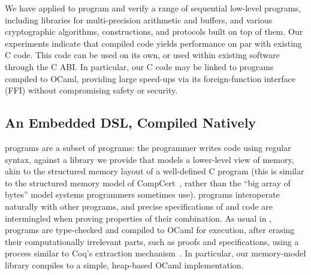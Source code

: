 We have applied \lowstar to program and verify a range of sequential low-level
programs, including libraries for multi-precision arithmetic and
buffers, and various cryptographic algorithms, constructions, and
protocols built on top of them.
%
Our experiments indicate that compiled \lowstar code yields performance
on par with existing C code. This code can be used on its own,
or used within existing software through the C ABI. In particular, our C code may
be linked to \fstar programs compiled to
OCaml, providing large speed-ups via its foreign-function interface (FFI)
without compromising safety or security.%




\subsection*{An Embedded DSL, Compiled Natively}

\lowstar programs are a subset of \fstar programs:
the programmer
writes \lowstar code using regular \fstar syntax, against a library we
provide that models a lower-level view of memory, akin to the
structured memory layout of a well-defined C program
(this is similar to the structured memory model
of CompCert~\cite{Leroy-Compcert-CACM, 2012-Leroy-Appel-Blazy-Stewart},
rather than the ``big array of bytes'' model systems programmers sometimes use).
%
\lowstar programs interoperate naturally with
other \fstar programs, and precise specifications of \lowstar and
\fstar code are intermingled when proving properties of their
combination. As usual in \fstar, programs are type-checked and compiled
to OCaml for execution, after erasing their computationally irrelevant parts,
such as proofs and specifications, using a process similar
to Coq's extraction mechanism~\cite{letouzey2002new}. 
In particular, our memory-model library compiles to a simple, heap-based OCaml implementation.

